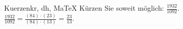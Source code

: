 \begin{MAufgabe}{Kuerzen}{kr, dh, MaTeX}
K\"urzen Sie soweit m\"oglich: $\frac{1932}{1092}$.\\ 
\ifLsg\MLoesung
\quad $\frac{1932}{1092}=\frac{(84)\cdot(23)}{(84)\cdot(13)}=\frac{23}{13}$.\else\relax\fi
 \end{MAufgabe}